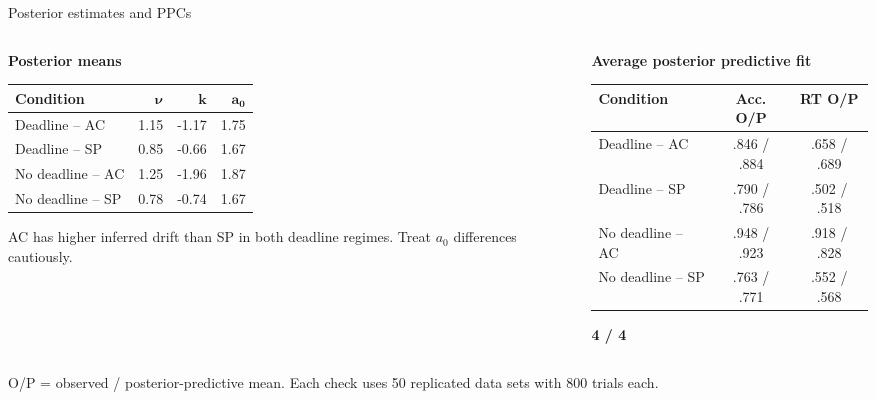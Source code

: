 \documentclass[aspectratio=43,10pt]{beamer}
\newcommand{\greenheading}[1]{%
  {\color{TUGreen}\fontsize{12}{14}\selectfont\bfseries #1\par}%
}
\begin{document}
\begin{frame}{Posterior estimates and PPCs}
  \vspace{0.03cm}
  \begin{columns}[T,onlytextwidth]
    \begin{column}{0.50\textwidth}
      \greenheading{Posterior means}
      {\fontsize{7.7}{9.5}\selectfont
      \begin{tabularx}{\linewidth}{>{\raggedright\arraybackslash}X r r r}
        \toprule
        \textbf{Condition} & $\boldsymbol{\nu}$ & $\boldsymbol{k}$ & $\boldsymbol{a_0}$ \\
        \midrule
        Deadline -- AC & 1.15 & -1.17 & 1.75 \\
        Deadline -- SP & 0.85 & -0.66 & 1.67 \\
        No deadline -- AC & 1.25 & -1.96 & 1.87 \\
        No deadline -- SP & 0.78 & -0.74 & 1.67 \\
        \bottomrule
      \end{tabularx}}
      \vspace{0.20cm}
      {\color{TUMuted}\fontsize{8.5}{10.5}\selectfont
      AC has higher inferred drift than SP in both deadline regimes. Treat $a_0$ differences cautiously.}
    \end{column}
    \begin{column}{0.47\textwidth}
      \greenheading{Average posterior predictive fit}
      {\fontsize{7.7}{9.5}\selectfont
      \begin{tabularx}{\linewidth}{>{\raggedright\arraybackslash}X c c}
        \toprule
        \textbf{Condition} & \textbf{Acc. O/P} & \textbf{RT O/P} \\
        \midrule
        Deadline -- AC & .846 / .884 & .658 / .689 \\
        Deadline -- SP & .790 / .786 & .502 / .518 \\
        No deadline -- AC & .948 / .923 & .918 / .828 \\
        No deadline -- SP & .763 / .771 & .552 / .568 \\
        \bottomrule
      \end{tabularx}}
      \vspace{0.20cm}
      {\color{TUGreen}\fontsize{13}{15}\selectfont\bfseries 4 / 4}
    \end{column}
  \end{columns}

  \vspace{0.26cm}
  {\color{TUMuted}\fontsize{8.8}{10.8}\selectfont
  O/P = observed / posterior-predictive mean. Each check uses 50 replicated data sets with 800 trials each.}
\end{frame}
\end{document}
